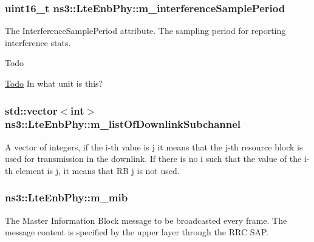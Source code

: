 \subsubsection[{\texorpdfstring{m\+\_\+interference\+Sample\+Period}{m_interferenceSamplePeriod}}]{\setlength{\rightskip}{0pt plus 5cm}uint16\+\_\+t ns3\+::\+Lte\+Enb\+Phy\+::m\+\_\+interference\+Sample\+Period\hspace{0.3cm}{\ttfamily [private]}}\hypertarget{classns3_1_1LteEnbPhy_a0df64498bdf6e3e601ea8567c8cc94f3}{}\label{classns3_1_1LteEnbPhy_a0df64498bdf6e3e601ea8567c8cc94f3}
The {\ttfamily Interference\+Sample\+Period} attribute. The sampling period for reporting interference stats. \begin{DoxyRefDesc}{Todo}
\item[\hyperlink{todo__todo000087}{Todo}]In what unit is this? \end{DoxyRefDesc}
\subsubsection[{\texorpdfstring{m\+\_\+list\+Of\+Downlink\+Subchannel}{m_listOfDownlinkSubchannel}}]{\setlength{\rightskip}{0pt plus 5cm}std\+::vector$<$int$>$ ns3\+::\+Lte\+Enb\+Phy\+::m\+\_\+list\+Of\+Downlink\+Subchannel\hspace{0.3cm}{\ttfamily [private]}}\hypertarget{classns3_1_1LteEnbPhy_a9409ac53b340b281a15b614edd3ea5d1}{}\label{classns3_1_1LteEnbPhy_a9409ac53b340b281a15b614edd3ea5d1}
A vector of integers, if the i-\/th value is j it means that the j-\/th resource block is used for transmission in the downlink. If there is no i such that the value of the i-\/th element is j, it means that RB j is not used. 
\subsubsection[{\texorpdfstring{m\+\_\+mib}{m_mib}}]{ ns3\+::\+Lte\+Enb\+Phy\+::m\+\_\+mib\hspace{0.3cm}{\ttfamily [private]}}\hypertarget{classns3_1_1LteEnbPhy_aa6c529e0bc2b61c26ea10cafae1afe18}{}\label{classns3_1_1LteEnbPhy_aa6c529e0bc2b61c26ea10cafae1afe18}
The Master Information Block message to be broadcasted every frame. The message content is specified by the upper layer through the R\+RC S\+AP. 
